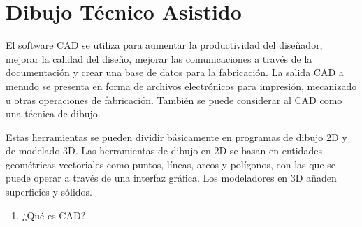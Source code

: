 \documentclass[../main]{subfiles}
\begin{document}
\section{Dibujo Técnico Asistido}


El software CAD se utiliza para aumentar la productividad del diseñador, mejorar la calidad del diseño, mejorar las comunicaciones a través de la documentación y crear una base de datos para la fabricación. La salida CAD a menudo se presenta en forma de archivos electrónicos para impresión, mecanizado u otras operaciones de fabricación. También se puede considerar al CAD como una técnica de dibujo.

Estas herramientas se pueden dividir básicamente en programas de dibujo 2D y de modelado 3D. Las herramientas de dibujo en 2D se basan en entidades geométricas vectoriales como puntos, líneas, arcos y polígonos, con las que se puede operar a través de una interfaz gráfica. Los modeladores en 3D añaden superficies y sólidos.
\newpage
{}
\begin{enumerate}
    \item ¿Qué es CAD?
\end{enumerate}
\end{document}
